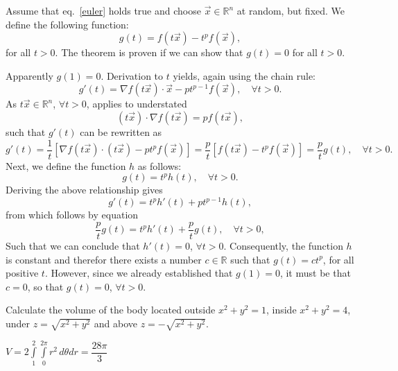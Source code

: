 \begin{Answer}\phantom{}
Assume that eq.~\eqref{euler} holds true and choose $\vec{x}\in\mathbb{R}^n$ at random, but fixed. We define the following function:
$$
g(t) = f(t\vec{x}) - t^p f(\vec{x}),
$$
for all $t>0$. The theorem is proven if we can show that $g(t) = 0$ for all $t>0$. 

Apparently $g(1) = 0$. Derivation to $t$ yields, again using the chain rule:
$$
g'(t) = \nabla f(t\vec{x}) \cdot \vec{x} - p t^{p-1} f(\vec{x}), \quad \forall t>0.
$$
As $t \vec{x} \in  \mathbb{R}^n$, $\forall t>0$, applies to understated
$$
(t\vec{x}) \cdot \nabla f(t\vec{x}) = pf(t\vec{x}),
$$
such that $g'(t)$ can be rewritten as
$$
g'(t) = \frac{1}{t} \left[ \nabla f(t\vec{x}) \cdot (t\vec{x}) - p t^p f(\vec{x}) \right] = 
\frac{p}{t} \left[ f(t \vec{x}) - t^p f(\vec{x}) \right] = \frac{p}{t} g(t), \quad \forall  t>0.
$$
Next, we define the function $h$ as follows:
$$
g(t) = t^p h(t), \quad \forall t>0.
$$
Deriving the above relationship gives
$$
g'(t) = t^p h'(t) + p t^{p-1} h(t),
$$
from which follows by equation 
$$
\frac{p}{t} g(t) = t^p h'(t) + \frac{p}{t} g(t), \quad \forall t>0,
$$
Such that we can conclude that $h'(t) = 0$, $\forall t>0$. Consequently, the function $h$ is constant and therefor there exists a number $c \in\mathbb{R}$ such that $g(t) = ct^p$, for all positive $t$.
However, since we already established that $g(1) = 0$, it must be that $c=0$, so that $g(t) = 0$, $\forall t>0$.
\end{Answer}



\begin{Exercise} %
Calculate the volume of the body located outside $x^2 + y^2 = 1$, inside $x^2 + y^2 =4$, under $z=\sqrt{x^2+y^2}$ and above $z=-\sqrt{x^2+y^2}$. %
\end{Exercise} 
\begin{Answer}\phantom{}
$V = 2 \displaystyle \int \limits_1^2 \int \limits_0^{2 \pi} r^2 \, d \theta dr = \dfrac{28 \pi}{3} $

\end{Answer}


